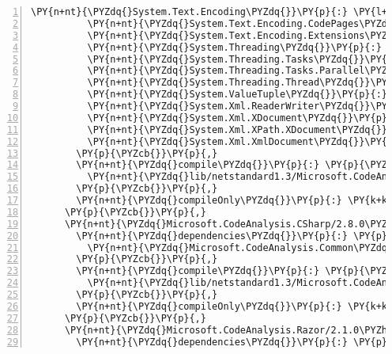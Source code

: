 \begin{Verbatim}[commandchars=\\\{\},numbers=left,firstnumber=1,stepnumber=1,numberblanklines=0]
          \PY{n+nt}{\PYZdq{}System.Text.Encoding\PYZdq{}}\PY{p}{:} \PY{l+s+s2}{\PYZdq{}4.3.0\PYZdq{}}\PY{p}{,}
          \PY{n+nt}{\PYZdq{}System.Text.Encoding.CodePages\PYZdq{}}\PY{p}{:} \PY{l+s+s2}{\PYZdq{}4.5.0\PYZhy{}rc1\PYZdq{}}\PY{p}{,}
          \PY{n+nt}{\PYZdq{}System.Text.Encoding.Extensions\PYZdq{}}\PY{p}{:} \PY{l+s+s2}{\PYZdq{}4.3.0\PYZdq{}}\PY{p}{,}
          \PY{n+nt}{\PYZdq{}System.Threading\PYZdq{}}\PY{p}{:} \PY{l+s+s2}{\PYZdq{}4.3.0\PYZdq{}}\PY{p}{,}
          \PY{n+nt}{\PYZdq{}System.Threading.Tasks\PYZdq{}}\PY{p}{:} \PY{l+s+s2}{\PYZdq{}4.3.0\PYZdq{}}\PY{p}{,}
          \PY{n+nt}{\PYZdq{}System.Threading.Tasks.Parallel\PYZdq{}}\PY{p}{:} \PY{l+s+s2}{\PYZdq{}4.3.0\PYZdq{}}\PY{p}{,}
          \PY{n+nt}{\PYZdq{}System.Threading.Thread\PYZdq{}}\PY{p}{:} \PY{l+s+s2}{\PYZdq{}4.3.0\PYZdq{}}\PY{p}{,}
          \PY{n+nt}{\PYZdq{}System.ValueTuple\PYZdq{}}\PY{p}{:} \PY{l+s+s2}{\PYZdq{}4.3.0\PYZdq{}}\PY{p}{,}
          \PY{n+nt}{\PYZdq{}System.Xml.ReaderWriter\PYZdq{}}\PY{p}{:} \PY{l+s+s2}{\PYZdq{}4.3.0\PYZdq{}}\PY{p}{,}
          \PY{n+nt}{\PYZdq{}System.Xml.XDocument\PYZdq{}}\PY{p}{:} \PY{l+s+s2}{\PYZdq{}4.3.0\PYZdq{}}\PY{p}{,}
          \PY{n+nt}{\PYZdq{}System.Xml.XPath.XDocument\PYZdq{}}\PY{p}{:} \PY{l+s+s2}{\PYZdq{}4.3.0\PYZdq{}}\PY{p}{,}
          \PY{n+nt}{\PYZdq{}System.Xml.XmlDocument\PYZdq{}}\PY{p}{:} \PY{l+s+s2}{\PYZdq{}4.3.0\PYZdq{}}
        \PY{p}{\PYZcb{}}\PY{p}{,}
        \PY{n+nt}{\PYZdq{}compile\PYZdq{}}\PY{p}{:} \PY{p}{\PYZob{}}
          \PY{n+nt}{\PYZdq{}lib/netstandard1.3/Microsoft.CodeAnalysis.dll\PYZdq{}}\PY{p}{:} \PY{p}{\PYZob{}}\PY{p}{\PYZcb{}}
        \PY{p}{\PYZcb{}}\PY{p}{,}
        \PY{n+nt}{\PYZdq{}compileOnly\PYZdq{}}\PY{p}{:} \PY{k+kc}{true}
      \PY{p}{\PYZcb{}}\PY{p}{,}
      \PY{n+nt}{\PYZdq{}Microsoft.CodeAnalysis.CSharp/2.8.0\PYZhy{}beta3\PYZdq{}}\PY{p}{:} \PY{p}{\PYZob{}}
        \PY{n+nt}{\PYZdq{}dependencies\PYZdq{}}\PY{p}{:} \PY{p}{\PYZob{}}
          \PY{n+nt}{\PYZdq{}Microsoft.CodeAnalysis.Common\PYZdq{}}\PY{p}{:} \PY{l+s+s2}{\PYZdq{}2.8.0\PYZhy{}beta3\PYZdq{}}
        \PY{p}{\PYZcb{}}\PY{p}{,}
        \PY{n+nt}{\PYZdq{}compile\PYZdq{}}\PY{p}{:} \PY{p}{\PYZob{}}
          \PY{n+nt}{\PYZdq{}lib/netstandard1.3/Microsoft.CodeAnalysis.CSharp.dll\PYZdq{}}\PY{p}{:} \PY{p}{\PYZob{}}\PY{p}{\PYZcb{}}
        \PY{p}{\PYZcb{}}\PY{p}{,}
        \PY{n+nt}{\PYZdq{}compileOnly\PYZdq{}}\PY{p}{:} \PY{k+kc}{true}
      \PY{p}{\PYZcb{}}\PY{p}{,}
      \PY{n+nt}{\PYZdq{}Microsoft.CodeAnalysis.Razor/2.1.0\PYZhy{}rc1\PYZhy{}final\PYZdq{}}\PY{p}{:} \PY{p}{\PYZob{}}
        \PY{n+nt}{\PYZdq{}dependencies\PYZdq{}}\PY{p}{:} \PY{p}{\PYZob{}}

\end{Verbatim}
